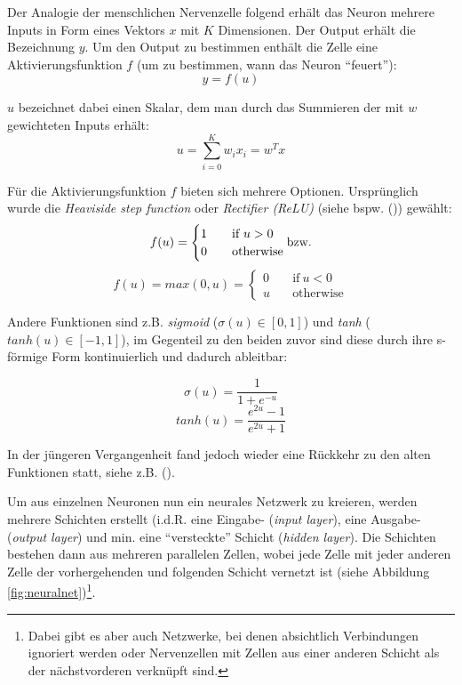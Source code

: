 Der Analogie der menschlichen Nervenzelle folgend erhält das Neuron mehrere Inputs in Form eines Vektors $x$ mit $K$
Dimensionen. Der Output erhält die Bezeichnung $y$. Um den Output zu bestimmen enthält die Zelle eine Aktivierungsfunktion
$f$ (um zu bestimmen, wann das Neuron ``feuert''):
\begin{equation}
  y = f(u)
\end{equation}

$u$ bezeichnet dabei einen Skalar, dem man durch das Summieren der mit $w$ gewichteten Inputs erhält:
\begin{equation}
  u = \sum_{i=0}^{K} w_i x_i = w^T x
\end{equation}

Für die Aktivierungsfunktion $f$ bieten sich mehrere Optionen. Ursprünglich wurde die \emph{Heaviside step function}
oder \emph{Rectifier (ReLU)} (siehe bspw. (\cite{abramowitz1964handbook})) gewählt:
\begin{equation}
    f(u) = \begin{cases} 1 & \quad \text{if}\ u > 0 \\ 0 & \quad \text{otherwise} \\ \end{cases} \text{bzw.} \\
\end{equation}
\begin{equation}
  f(u) = max(0,u) = \begin{cases} 0 & \quad \text{if}\ u < 0 \\ u & \quad \text{otherwise} \end{cases}
\end{equation}

Andere Funktionen sind z.B. \emph{sigmoid} ($\sigma(u) \in [0,1]$)
und \emph{tanh} ($tanh(u) \in [-1, 1]$), im Gegenteil zu den beiden zuvor sind diese durch ihre s-förmige Form
kontinuierlich und dadurch ableitbar:

\begin{equation}
  \sigma(u) = \frac{1}{1 + e^{-u}}
\end{equation}
\begin{equation}
  tanh(u) = \frac{e^{2u}-1}{e^{2u}+1}
\end{equation}

In der jüngeren Vergangenheit fand jedoch wieder eine Rückkehr zu den alten Funktionen statt, siehe z.B. (\cite{maas2013rectifier}).

Um aus einzelnen Neuronen nun ein neurales Netzwerk zu kreieren, werden mehrere Schichten erstellt (i.d.R. eine Eingabe-
(\emph{input layer}), eine Ausgabe- (\emph{output layer}) und min. eine ``versteckte'' Schicht (\emph{hidden layer}).
Die Schichten bestehen dann aus mehreren parallelen Zellen, wobei jede Zelle mit jeder anderen Zelle der vorhergehenden und
folgenden Schicht vernetzt ist (siehe Abbildung \ref{fig:neuralnet})\footnote{Dabei gibt es aber auch Netzwerke, bei denen
absichtlich Verbindungen ignoriert werden oder Nervenzellen mit Zellen aus einer anderen Schicht als der nächstvorderen
verknüpft sind.}.


